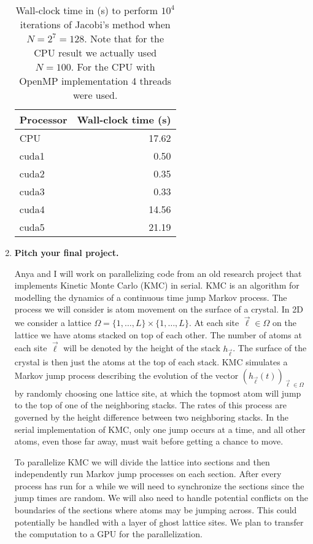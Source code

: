 \documentclass[12pt]{article}
\begin{document}
\begin{enumerate}
\begin{table}[H]
\centering
\begin{tabular}{| l | r |}
\hline
Processor & Wall-clock time (s) \\
\hline
CPU &  17.62  \\
\hline
cuda1 &  0.50 \\
\hline
cuda2 &  0.35 \\
\hline
cuda3 & 0.33  \\
\hline
cuda4 & 14.56 \\
\hline
cuda5 &  21.19\\
\hline
\end{tabular}
\caption{Wall-clock time in (s) to perform $10^{4}$ iterations of Jacobi's method when $N = 2^7 = 128$.  Note that for the CPU result we actually used $N=100$.  For the CPU with OpenMP implementation 4 threads were used.}
\end{table}

\item {\bf Pitch your final project.}  \\

\par  Anya and I will work on parallelizing code from an old research project that implements Kinetic Monte Carlo (KMC) in serial.  KMC is an algorithm for modelling the dynamics of a continuous time jump Markov process. The process we will consider is atom movement on the surface of a crystal.  In 2D we consider a lattice $\Omega = \{1,\ldots,L\} \times \{1,\ldots,L\}$.  At each site $\vec{\ell} \in \Omega$ on the lattice we have atoms stacked on top of each other.  The number of atoms at each site $\vec{\ell}$ will be denoted by the height of the stack $h_{\vec{\ell}}$.  The surface of the crystal is then just the atoms at the top of each stack.  KMC simulates a Markov jump process describing the evolution of the vector $(h_{\vec{\ell}}(t))_{\vec{\ell} \in \Omega}$ by randomly choosing one lattice site, at which the topmost atom will jump to the top of one of the neighboring stacks. The rates of this process are governed by the height difference between two neighboring stacks.  In the serial implementation of KMC, only one jump occurs at a time, and all other atoms, even those far away, must wait before getting a chance to move. \\

\par To parallelize KMC we will divide the lattice into sections and then independently run Markov jump processes on each section.  After every process has run for a while we will need to synchronize the sections since the jump times are random.  We will also need to handle potential conflicts on the boundaries of the sections where atoms may be jumping across.  This could potentially be handled with a layer of ghost lattice sites.  We plan to transfer the computation to a GPU for the parallelization.  \\


\end{enumerate}
\end{document}
